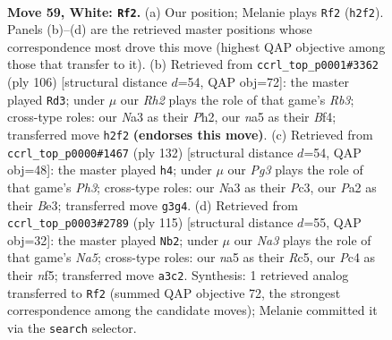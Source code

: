 \documentclass[11pt]{article}
\begin{document}
\clearpage

\begin{figure}[p]\centering
\begin{subfigure}{0.46\textwidth}\centering
\resizebox{\linewidth}{!}{%
\newchessgame
\chessboard[
  setfen={7r/p7/1pr1p1k1/n6p/2PKPB2/N5P1/P6R/1R6 w - - 0 59},
  showmover=false,
  pgfstyle=straightmove, color=movearrow, markmove={h2-f2}
]}
\caption{}
\end{subfigure}\hfill
\begin{subfigure}{0.46\textwidth}\centering
\resizebox{\linewidth}{!}{%
\newchessgame
\chessboard[
  setfen={8/1r3k2/1p1P2rp/p1p2p2/P1P2B2/1R3KP1/1P5P/8 w - - 12 54},
  showmover=false,
  pgfstyle=straightmove, color=movearrow, markmove={b3-d3}
]}
\caption{}
\end{subfigure}
\\[4pt]
\begin{subfigure}{0.46\textwidth}\centering
\resizebox{\linewidth}{!}{%
\newchessgame
\chessboard[
  setfen={r4r2/8/4k1p1/3p4/p1p2PP1/1nP1B2P/R6K/3R4 w - - 0 67},
  showmover=false,
  pgfstyle=straightmove, color=movearrow, markmove={h3-h4}
]}
\caption{}
\end{subfigure}\hfill
\begin{subfigure}{0.46\textwidth}\centering
\resizebox{\linewidth}{!}{%
\newchessgame
\chessboard[
  setfen={3r1k2/3P1p2/1p3R2/p1r2N1p/n6P/5PP1/5K2/3R4 b - - 0 58},
  showmover=false,
  pgfstyle=straightmove, color=movearrow, markmove={a4-b2}
]}
\caption{}
\end{subfigure}
\caption{\textbf{Move 59, White: \texttt{Rf2}.} (a) Our position; Melanie plays \texttt{Rf2} (\texttt{h2f2}). Panels (b)--(d) are the retrieved master positions whose correspondence most drove this move (highest QAP objective among those that transfer to it). (b) Retrieved from \texttt{ccrl\_top\_p0001\#3362} (ply 106) [structural distance $d$=54, QAP obj=72]: the master played \texttt{Rd3}; under $\mu$ our \emph{Rh2} plays the role of that game's \emph{Rb3}; cross-type roles: our \emph{N}a3 as their \emph{P}h2, our \emph{n}a5 as their \emph{B}f4; transferred move \texttt{h2f2} \textbf{(endorses this move)}. (c) Retrieved from \texttt{ccrl\_top\_p0000\#1467} (ply 132) [structural distance $d$=54, QAP obj=48]: the master played \texttt{h4}; under $\mu$ our \emph{Pg3} plays the role of that game's \emph{Ph3}; cross-type roles: our \emph{N}a3 as their \emph{P}c3, our \emph{P}a2 as their \emph{B}e3; transferred move \texttt{g3g4}. (d) Retrieved from \texttt{ccrl\_top\_p0003\#2789} (ply 115) [structural distance $d$=55, QAP obj=32]: the master played \texttt{Nb2}; under $\mu$ our \emph{Na3} plays the role of that game's \emph{Na5}; cross-type roles: our \emph{n}a5 as their \emph{R}c5, our \emph{P}c4 as their \emph{n}f5; transferred move \texttt{a3c2}. Synthesis: 1 retrieved analog transferred to \texttt{Rf2} (summed QAP objective 72, the strongest correspondence among the candidate moves); Melanie committed it via the \texttt{search} selector.}
\label{fig:thought-m116}
\end{figure}
\end{document}
